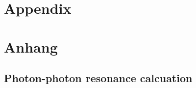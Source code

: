
{\chapter{Appendix}}    %
{\chapter{Anhang}}      %
\label{chap:appendix}
\setcounter{figure}{0}

\section{Photon-photon resonance calcuation}\label{sec:PP_resonance_cal}
